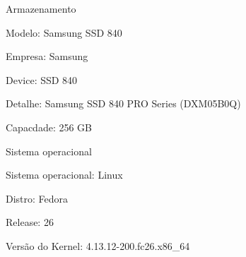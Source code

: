 \begin{alineas}
  \item Armazenamento

  \begin{alineas}
     \item Modelo: Samsung SSD 840
     \item Empresa: Samsung
     \item Device: SSD 840
     \item Detalhe: Samsung SSD 840 PRO Series (DXM05B0Q)
     \item Capacdade: 256 GB
  \end{alineas}

  \item Sistema operacional

  \begin{alineas}
     \item Sistema operacional: Linux
     \item Distro: Fedora
     \item Release: 26
     \item Versão do Kernel: 4.13.12-200.fc26.x86_64
  \end{alineas}

\end{alineas}
